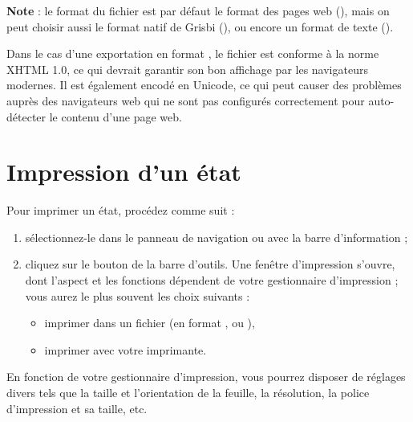 \textbf{Note} : le format du fichier est par défaut le format des pages web (), mais on peut choisir aussi le format natif de Grisbi (), ou encore un format de texte ().
 

Dans le cas d'une exportation en format , le fichier est conforme à la norme XHTML 1.0, ce qui devrait garantir son bon affichage par les navigateurs modernes.  Il est également encodé en Unicode, ce qui peut causer des problèmes auprès des navigateurs web qui ne sont pas configurés correctement pour auto-détecter le contenu d'une page web.


\section{Impression d'un état\label{reports-print}}


Pour imprimer un état, procédez comme suit :

\begin{enumerate}
	 \item sélectionnez-le dans le panneau de navigation ou avec la barre d'information ;
	 \item cliquez sur le bouton  de la barre d'outils. Une fenêtre d'impression s'ouvre, dont l'aspect et les fonctions dépendent de votre gestionnaire d'impression ; vous aurez le plus souvent les choix suivants :
		  \begin{itemize}
			  \item imprimer dans un fichier (en format ,  ou ),
			  \item imprimer avec votre imprimante.
		  \end{itemize}
\end{enumerate}

En fonction de votre gestionnaire d'impression, vous pourrez disposer de réglages divers tels que la taille et l'orientation de la feuille, la résolution, la police d'impression et sa taille, etc.











